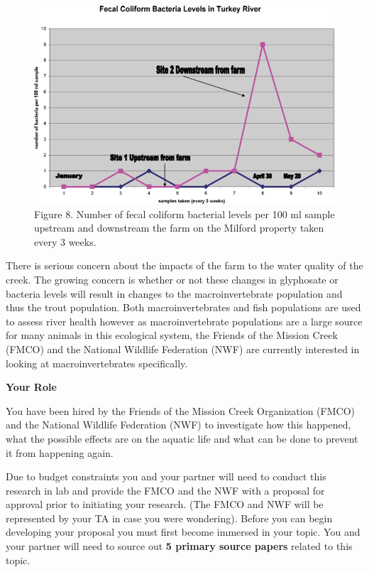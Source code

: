 \documentclass[
]{book}
\begin{document}
\begin{figure}
\centering
\includegraphics{images/figure8.png}
\caption{Figure 8. Number of fecal coliform bacterial levels per 100 ml sample upstream and downstream the farm on the Milford property taken every 3 weeks.}
\end{figure}

There is serious concern about the impacts of the farm to the water quality of the creek. The growing concern is whether or not these changes in glyphosate or bacteria levels will result in changes to the macroinvertebrate population and thus the trout population. Both macroinvertebrates and fish populations are used to assess river health however as macroinvertebrate populations are a large source for many animals in this ecological system, the Friends of the Mission Creek (FMCO) and the National Wildlife Federation (NWF) are currently interested in looking at macroinvertebrates specifically.

\textbf{Your Role}

You have been hired by the Friends of the Mission Creek Organization (FMCO) and the National Wildlife Federation (NWF) to investigate how this happened, what the possible effects are on the aquatic life and what can be done to prevent it from happening again.

Due to budget constraints you and your partner will need to conduct this research in lab and provide the FMCO and the NWF with a proposal for approval prior to initiating your research. (The FMCO and NWF will be represented by your TA in case you were wondering). Before you can begin developing your proposal you must first become immersed in your topic. You and your partner will need to source out \textbf{5 primary source papers} related to this topic.
\end{document}
